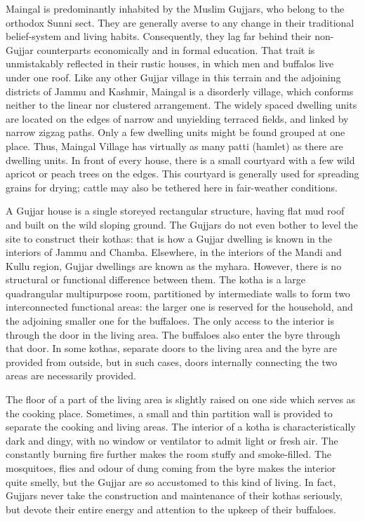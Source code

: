 Maingal is predominantly inhabited by the Muslim Gujjars, who belong to the orthodox Sunni sect. They are generally averse to any change in their traditional belief-system and living habits. Consequently, they lag far behind their non-Gujjar counterparts economically and in formal education. That trait is unmistakably reflected in their rustic houses, in which men and buffalos live under one roof. Like any other Gujjar village in this terrain and the adjoining districts of Jammu and Kashmir, Maingal is a disorderly village, which conforms neither to the linear nor clustered arrangement. The widely spaced dwelling units are located on the edges of narrow and unyielding terraced fields, and linked by narrow zigzag paths. Only a few dwelling units might be found grouped at one place. Thus, Maingal Village has virtually as many patti (hamlet) as there are dwelling units. In front of every house, there is a small courtyard with a few wild apricot or peach trees on the edges. This courtyard is generally used for spreading grains for drying; cattle may also be tethered here in fair-weather conditions.

A Gujjar house is a single storeyed rectangular structure, having flat mud roof and built on the wild sloping ground. The Gujjars do not even bother to level the site to construct their kothas: that is how a Gujjar dwelling is known in the interiors of Jammu and Chamba. Elsewhere, in the interiors of the Mandi and Kullu region, Gujjar dwellings are known as the myhara. However, there is no structural or functional difference between them. The kotha is a large quadrangular multipurpose room, partitioned by intermediate walls to form two interconnected functional areas: the larger one is reserved for the household, and the adjoining smaller one for the buffaloes. The only access to the interior is through the door in the living area. The buffaloes also enter the byre through that door. In some kothas, separate doors to the living area and the byre are provided from outside, but in such cases, doors internally connecting the two areas are necessarily provided.

The floor of a part of the living area is slightly raised on one side which serves as the cooking place. Sometimes, a small and thin partition wall is provided to separate the cooking and living areas. The interior of a kotha is characteristically dark and dingy, with no window or ventilator to admit light or fresh air. The constantly burning fire further makes the room stuffy and smoke-filled. The mosquitoes, flies and odour of dung coming from the byre makes the interior quite smelly, but the Gujjar are so accustomed to this kind of living. In fact, Gujjars never take the construction and maintenance of their kothas seriously, but devote their entire energy and attention to the upkeep of their buffaloes.

